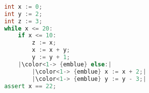 \begin{lstlisting}[language=C++,basicstyle=\ttfamily,keywordstyle=\color{blue}, escapechar={|}]  % Start your code-block
	
	int x := 0;
	int y := 2;
	int z := 3;
	while x <= 20:
		if x <= 10:
			z := x;
			x := x + y;
			y := y + 1;
		|\color<1-> {emblue} else:|
			|\color<1-> {emblue} x := x + 2;|
			|\color<1-> {emblue} y := y - 3;|
	assert x == 22;
	\end{lstlisting}